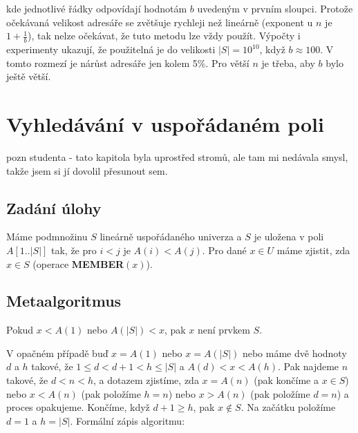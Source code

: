 \documentclass[a4paper,12pt]{article}
\begin{document}
kde jednotlivé řádky odpovídají hodnotám $
b$ 
uvedeným v prv\-ním sloupci. Protože očekávaná velikost 
adresáře se zvětšu\-je rychleji než lineárně (exponent u $
n$ je $1+\frac 1b$), 
tak nelze očekávat, že tuto metodu lze vždy použít. 
Výpočty i expe\-ri\-menty uka\-zu\-jí, že použitelná je do 
velikosti $|S|=10^{10}$, když $b\approx 100$. V tomto rozmezí je 
nárůst adresáře jen kolem 5\%. Pro větší $
n$ je 
třeba, aby $b$ bylo ještě větší.


\section{Vyhledávání v uspořádaném poli}
pozn studenta - tato kapitola byla uprostřed stromů, ale tam mi nedávala smysl, takže jsem si jí dovolil přesunout sem.

\subsection{Zadání úlohy}
Máme podmnožinu $S$ lineárně 
uspořádaného univerza a $S$ je uložena v poli 
$A[1..|S|]$ tak, že pro $i<j$ je $A(i)<A(j)$. Pro dané $x\in 
U$ 
máme zjistit, zda $x\in S$ (operace {\bf MEMBER$(x)$}).

\subsection{Metaalgoritmus}
Pokud $x<A(1)$ nebo $A(|S|)<x$, pak $
x$ 
není prvkem $S$. 

 V opačném případě buď $x=
A(1)$ nebo 
$x=A(|S|)$ nebo máme dvě hodnoty $d$ 
a $h$ takové, že $1\le d<d+1<h\le |S|$ a $A(d)<x<A(h)$.  Pak 
najdeme $n$ takové, že $d<n<h$, a dotazem 
zjistíme, zda $x=A(n)$ (pak končíme a $x\in S$) nebo 
$x<A(n)$ (pak položíme $h=n$) nebo $x>A(n)$ (pak 
položíme $d=n$) a proces opakujeme.  Končíme, když 
$d+1\ge h$, pak $x\notin S$. Na začátku položíme $d=1$ a $
h=|S|$.
Formální zápis algoritmu:
\end{document}
